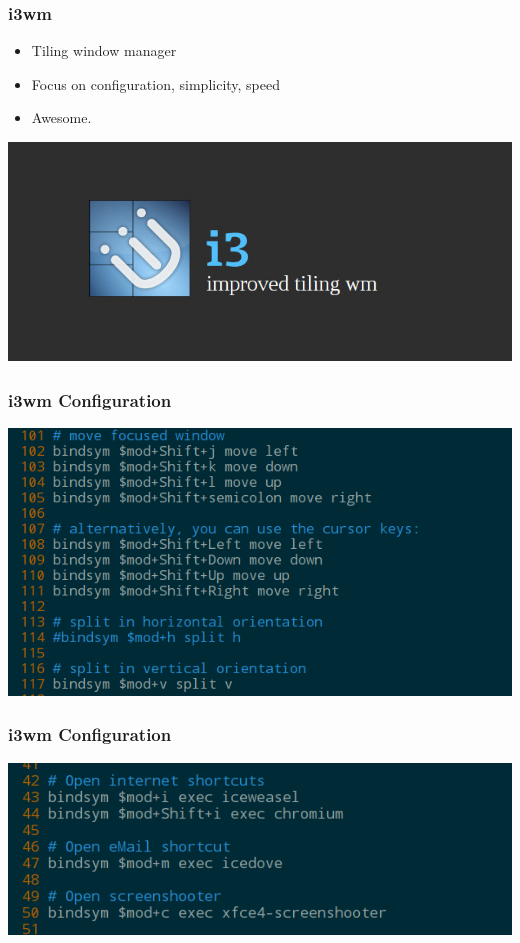 \documentclass{beamer}
\begin{document}
\begin{frame}
  \frametitle{i3wm}
  \begin{itemize}
    \item Tiling window manager
    \item Focus on configuration, simplicity, speed
    \item Awesome.
  \end{itemize}
  \includegraphics[scale=0.3]{images/i3wm}
\end{frame}

\begin{frame}
  \frametitle{i3wm Configuration}
  \includegraphics[scale=0.5]{images/i3-config-example}
\end{frame}

\begin{frame}
  \frametitle{i3wm Configuration}
  \includegraphics[scale=0.5]{images/i3-internet-config}
\end{frame}
\end{document}
